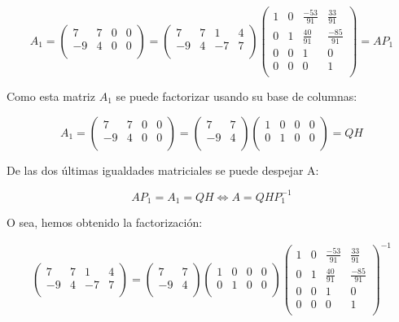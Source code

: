 \documentclass[11pt, a4paper]{article}
\newif\IfInSansMode
\theoremstyle{theorem-style}
\theoremstyle{definition-style}
\theoremstyle{remark-style}
\theoremstyle{example-style}
\begin{document}
$$A_1 = \begin{pmatrix}
7 & 7 & 0 & 0 \\
-9 & 4 & 0 & 0 \\
\end{pmatrix} = \begin{pmatrix}
7 & 7 & 1 & 4 \\
-9 & 4 & -7 & 7 \\
\end{pmatrix} \begin{pmatrix}
1 & 0 & \frac{-53}{91} & \frac{33}{91} \\
0 & 1 & \frac{40}{91} & \frac{-85}{91} \\
0 & 0 & 1 & 0 \\
0 & 0 & 0 & 1 \\
\end{pmatrix} = AP_1$$

Como esta matriz $A_1$ se puede factorizar usando su base de columnas:

$$A_1 = \begin{pmatrix}
7 & 7 & 0 & 0 \\
-9 & 4 & 0 & 0 \\
\end{pmatrix} = \begin{pmatrix}
7 & 7 \\
-9 & 4 \\
\end{pmatrix} \begin{pmatrix}
1 & 0 & 0 & 0 \\
0 & 1 & 0 & 0 \\
\end{pmatrix} = QH$$

De las dos últimas igualdades matriciales se puede despejar A:

$$AP_1 = A_1 = QH \Leftrightarrow A = QHP_1^{-1}$$

O sea, hemos obtenido la factorización:

$$ \begin{pmatrix}
7 & 7 & 1 & 4 \\
-9 & 4 & -7 & 7 \\
\end{pmatrix} = \begin{pmatrix}
7 & 7 \\
-9 & 4 \\
\end{pmatrix} \begin{pmatrix}
1 & 0 & 0 & 0 \\
0 & 1 & 0 & 0 \\
\end{pmatrix} \begin{pmatrix}
1 & 0 & \frac{-53}{91} & \frac{33}{91} \\
0 & 1 & \frac{40}{91} & \frac{-85}{91} \\
0 & 0 & 1 & 0 \\
0 & 0 & 0 & 1 \\
\end{pmatrix}^{-1}$$
\end{document}
